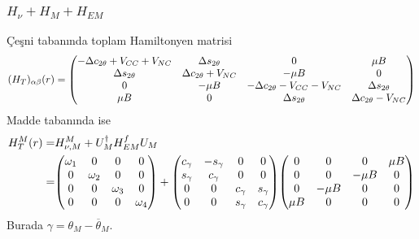 \documentclass[10pt]{beamer}
\begin{document}
\begin{frame}
    \frametitle{$H_{\nu}+ H_{M}+ H_{EM}$}
    Çeşni tabanında toplam Hamiltonyen matrisi
    \tiny
    \begin{equation*}
        (H_{T})_{\alpha\beta}(r) = \mqty(-\Delta c_{2\theta}+V_{CC}+V_{NC} & \Delta s_{2\theta} & 0 & \mu B\\\Delta s_{2\theta} & \Delta c_{2\theta} + V_{NC}& -\mu B & 0
        \\0 & -\mu B& -\Delta c_{2\theta}-V_{CC}-V_{NC} & \Delta s_{2\theta}\\ \mu B& 0 & \Delta s_{2\theta} & \Delta c_{2\theta}-V_{NC} )
    \end{equation*}
    \normalsize
    Madde tabanında ise
    \tiny
    \begin{align*}
        H^{M}_{T}(r) =& H^{M}_{\nu,M} + U^{\dagger}_{M} H^{f}_{EM} U_{M}\\
        =& \mqty(\omega_{1} & 0 & 0 & 0\\0 & \omega_{2} & 0 & 0\\0 & 0 & \omega_{3} & 0\\0 & 0 & 0 & \omega_{4}) + \mqty(c_{\gamma} & -s_{\gamma} & 0 & 0\\s_{\gamma} & c_{\gamma} & 0 & 0\\0 & 0 & c_{\gamma} & s_{\gamma}\\0 & 0 & s_{\gamma} & c_{\gamma})\mqty(0&0&0&\mu B\\0&0&-\mu B&0\\0&-\mu B&0&0\\\mu B&0&0&0)
    \end{align*}
    \normalsize
    Burada $ \gamma = \theta_{M} - \overline{\theta}_{M} $.
\end{frame}
\end{document}
